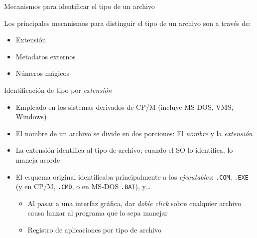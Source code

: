 \documentclass[presentation]{beamer}
\begin{document}
\begin{frame}[label={sec:org37ecb96}]{Mecanismos para identificar el tipo de un archivo}
\begin{center}
Los principales mecanismos para distinguir el tipo de un archivo son
a través de:
\end{center}
\begin{itemize}
\item Extensión
\item Metadatos externos
\item Números mágicos
\end{itemize}
\end{frame}

\begin{frame}[label={sec:org3e50580},fragile]{Identificación de tipo por \emph{extensión}}
 \begin{itemize}
\item Empleado en los sistemas derivados de CP/M (incluye MS-DOS, VMS,
Windows)
\item El nombre de un archivo se divide en dos porciones: El \emph{nombre} y
la \emph{extensión}
\item La extensión identifica al tipo de archivo; cuando el SO lo
identifica, lo maneja acorde
\item El esquema original identificaba principalmente a los
\emph{ejecutables}: \texttt{.COM}, \texttt{.EXE} (y en CP/M, \texttt{.CMD}, o en MS-DOS
\texttt{.BAT}), y\ldots{}
\begin{itemize}
\item Al pasar a una interfaz gráfica, dar \emph{doble click} sobre cualquier
archivo causa lanzar al programa que lo sepa manejar
\item Registro de aplicaciones por tipo de archivo
\end{itemize}
\end{itemize}
\end{frame}
\end{document}
